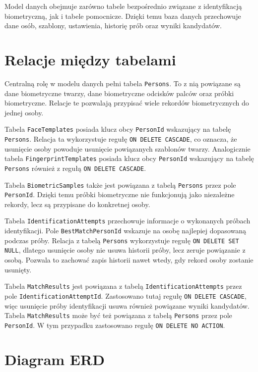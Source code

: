 \setlength{\tabcolsep}{6pt}

Model danych obejmuje zarówno tabele bezpośrednio związane z identyfikacją biometryczną, jak i tabele pomocnicze. Dzięki temu baza danych przechowuje dane osób, szablony, ustawienia, historię prób oraz wyniki kandydatów.

\section{Relacje między tabelami}

Centralną rolę w modelu danych pełni tabela \texttt{Persons}. To z nią powiązane są dane biometryczne twarzy, dane biometryczne odcisków palców oraz próbki biometryczne. Relacje te pozwalają przypisać wiele rekordów biometrycznych do jednej osoby.

Tabela \texttt{FaceTemplates} posiada klucz obcy \texttt{PersonId} wskazujący na tabelę \texttt{Persons}. Relacja ta wykorzystuje regułę \texttt{ON DELETE CASCADE}, co oznacza, że usunięcie osoby powoduje usunięcie powiązanych szablonów twarzy. Analogicznie tabela \texttt{FingerprintTemplates} posiada klucz obcy \texttt{PersonId} wskazujący na tabelę \texttt{Persons} również z regułą \texttt{ON DELETE CASCADE}.

Tabela \texttt{BiometricSamples} także jest powiązana z tabelą \texttt{Persons} przez pole \texttt{PersonId}. Dzięki temu próbki biometryczne nie funkcjonują jako niezależne rekordy, lecz są przypisane do konkretnej osoby.

Tabela \texttt{IdentificationAttempts} przechowuje informacje o wykonanych próbach identyfikacji. Pole \texttt{BestMatchPersonId} wskazuje na osobę najlepiej dopasowaną podczas próby. Relacja z tabelą \texttt{Persons} wykorzystuje regułę \texttt{ON DELETE SET NULL}, dlatego usunięcie osoby nie usuwa historii próby, lecz zeruje powiązanie z osobą. Pozwala to zachować zapis historii nawet wtedy, gdy rekord osoby zostanie usunięty.

Tabela \texttt{MatchResults} jest powiązana z tabelą \texttt{IdentificationAttempts} przez pole \texttt{IdentificationAttemptId}. Zastosowano tutaj regułę \texttt{ON DELETE CASCADE}, więc usunięcie próby identyfikacji usuwa również powiązane wyniki kandydatów. Tabela \texttt{MatchResults} może być też powiązana z tabelą \texttt{Persons} przez pole \texttt{PersonId}. W tym przypadku zastosowano regułę \texttt{ON DELETE NO ACTION}.

\section{Diagram ERD}

